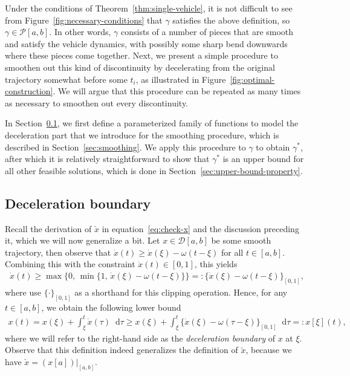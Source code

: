 \documentclass[a4paper]{report}
\theoremstyle{definition}
\theoremstyle{plain}
\newcommand*\diff{\mathop{}\!\mathrm{d}}
\begin{document}
Under the conditions of Theorem~\ref{thm:single-vehicle}, it is not difficult to
see from Figure~\ref{fig:necessary-conditions} that $\gamma$ satisfies the above definition, so
$\gamma \in \mathcal{P}[a,b]$. In other words, $\gamma$ consists of a number of pieces that
are smooth and satisfy the vehicle dynamics, with possibly some sharp bend
downwards where these pieces come together.
%
Next, we present a simple procedure to smoothen out this kind of discontinuity
by decelerating from the original trajectory somewhat before some $t_{i}$, as
illustrated in Figure~\ref{fig:optimal-construction}. We will argue that this procedure can be repeated as
many times as necessary to smoothen out every discontinuity.


In Section~\ref{sec:deceleration-boundary}, we first define a parameterized
family of functions to model the deceleration part that we introduce for the
smoothing procedure, which is described in Section~\ref{sec:smoothing}.
%
We apply this procedure to $\gamma$ to obtain $\gamma^{*}$, after which it is
relatively straightforward to show that $\gamma^{*}$ is an upper bound for all
other feasible solutions, which is done in
Section~\ref{sec:upper-bound-property}.


\subsection{Deceleration boundary}\label{sec:deceleration-boundary}
%
Recall the derivation of $\check{x}$ in equation~\eqref{eq:check-x} and the discussion
preceding it, which we will now generalize a bit.
%
Let $x \in \mathcal{D}[a, b]$ be some smooth trajectory, then observe that $\dot{x}(t) \geq \dot{x}(\xi) - \omega(t - \xi)$ for all $t \in [a, b]$.
Combining this with the constraint $\dot{x}(t) \in [0, 1]$, this yields
\begin{align}
  \dot{x}(t) \geq \max\{ 0, \, \min\{1, \, \dot{x}(\xi) - \omega (t - \xi) \}\} =: \{\dot{x}(\xi) - \omega(t-\xi)\}_{[0,1]} ,
\end{align}
where use $\{ \cdot \}_{[0,1]}$ as a shorthand for this clipping operation.
%
Hence, for any $t \in [a,b]$, we obtain the following lower bound
\begin{align}\label{eq:deceleration-boundary}
  x(t) = x(\xi) + \int_{\xi}^{t} \dot{x}(\tau) \diff \tau \geq x(\xi) + \int_{\xi}^{t} \{\dot{x}(\xi) - \omega(\tau - \xi)\}_{[0,1]} \diff \tau =: x[\xi] (t) ,
\end{align}
where we will refer to the right-hand side as the \emph{deceleration boundary} of $x$
at $\xi$.
%
Observe that this definition indeed generalizes the definition of $\check{x}$,
because we have $\check{x}=(x[a])|_{[a,b]}$.
\end{document}
